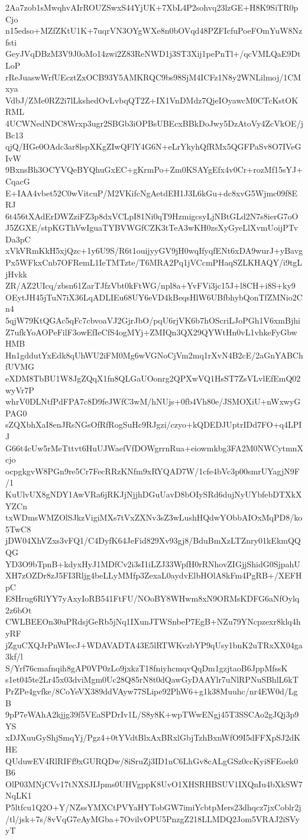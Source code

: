 2Aa7zob1sMwqhvAIrROUZSwxS44YjUK+7XbL4P2sohvq23lzGE+H8K9SiTR0pCjo
n15edso+MZfZKtU1K+7uqrVN3OYgWXe8n0bOVqd48PZFIcfuPoeFOmYuW8Nzfsti
GeyJVqDBzM3V9J0oMo14zwi2Z83ReNWD1j3ST3Xij1pePnTl+/qcVMLQaE9DtLoP
rReJuaswWrfUEcztZxOCB93Y5AMKRQC9bs98SjM4ICFz1N8y2WNLilmoj/1CMxya
VdbJ/ZMe0RZ2i7lLkshedOvLvbqQT2Z+IX1VnDMdz7QjeIOyawcM0CTcKstOKRML
4UCWNedNDC8Wrxp3ugr2SBGb3iOPBsUBEcxBBkDoJwy5DzAtoVy4ZcVkOE/jBc13
qjQ/HGe0OAdc3ar8lspXKgZIwQFlY4G6N+eLrYkyhQfRMx5QGFPaSv8O7IVeGIvW
9BxnsBh3OCYVQeBYQhuGxEC+gKrmPo+Zm0KSAYgEfx4v0Cr+rozMf15sYJ+CqacG
E+IAA4vbet52C0wVitcuP/M2VKifcNgAetdEH1J3L6kGu+dc8xvG5Wjmc09f8ERJ
6t456tXAdErDWZziFZ3p8dxVCLpI81Ni0qT9HzmigcsyLjNBtGLd2N7s8ierG7oO
J5ZGXE/stpKGThVwIguaTYBVWGfCZK3tTeA3wKH0zsXyGyeLlXvmUoijPTvDa3pC
xVkVRmKkH5xjQzc+1y6U9S/R6t1ouijyyGV9jH0wqIfyqfENt6xDA9wurJ+yBavg
Px5WFkxCnb7OFRemL1IeTMTzte/T6MRA2Pq1jVCcmPHaqSZLKHAQY/i9tgLjHvkk
ZR/AZ2UIcq/zbsn61ZarTJfzVbt0kFtWG/npl8a+YvFVi3jc15J+l8CH+i8S+ky9
OEytJH45jTuN7iX36LqADLIEu68UY6eVD4kBeqsHlW6UBfbhybQonTfZMNio2Cn4
5qjW79KtQGAc5qFc7cbvoaVJ2GjrJbO/pqU6rjVK6b7hOScriLJoPGh1V6xmBjhi
Z7ufkYoAOPeFilF3owEfIeCfS4ogMYj+ZMIQn3QX29QYWtHn0vL1vhkeFyGbwHMB
Hn1gddutYxEdk8qUhWU2iFM0Mg6wVGNoCjVm2mq1rXvN4B2cE/2aGnYABChfUVMG
eXDM8TbBU1W8JgZQqX1fn8QLGaUOonrg2QPXwVQ1HsST7ZsVLvlEfEmQ02wyVr7P
whrV0DLNtfPdFPA7c8D9feJWfC3wM/hNUjs+0fb4Vh80e/JSMOXiU+nWxwyGPAG0
sZQXbhXaI8enJRsNGsOfRfRogSuHc9RJgzi/czyo+kQDEDJUptrIDd7FO+q4LPIJ
G66t4cUw5rMeTttvt6HuUJWaefVfDOWgrrnRua+eiowmkbg3FA2M0NWCytmnXcjo
ocpgkgvW8PGn9re5Cr7FecRRzKNfm9xRYQAD7W/1cfe4bVc3p00smrUYagjN9F/1
KuUlvUX8gNDY1AwVRa6jRKJjNjjhDGuUavD8bOIySRd6dujNyUYbfebDTXkXYZCn
txWDmsWMZOlSJkzVigiMXs7tVxZXNv3sZ3wLushHQdwYObbAIOxMqPD8/ko5TwC8
jDW04XhVZxs3vFQ1/C4DyfK64JeFid829Xv93gj8/BduBmXzLTZnry01kEkmQQQG
YD3O9bTpnB+kdyxHyJ1MDfCv2i3sI1iLZJ33WpfH0rRNhovZIGjjShidG0SjpahU
XH7zOZDr8zJ5FI3Rljg4beLLyMMfp3ZexaL0aydvElbHOlA8kFm4PgRB+/XEFHpC
E8Hrug6RlYY7yAxyIoRB541FtFU/NOoBY8WHwm8xN9ORMsKDFG6aNfOylq2z6bOt
CWLBEEOn30uPRdsjGeRb5jNq1IXunJTWSnbeP7EgB+NZu79YNcpzexr8klq4hyRF
jZguCXQJrPnWIecJ+WDAVADTA43E5lRTWKvzbYP9qUsy1bnK2uTRxXX04ga3kf/l
S/Yrf76cmafnqih8gAP0VP0zLo9jxkzT18fniyhcmqvQqDm1gzjtaoB6JppMfssK
s1et045te2Lr45x03dviMgm0Uc28Q85rN8t0dQawGyDAAYlr7uNlRPNuSBhlL6kT
PrZPe4gvfke/8CoYeVX389ddVAyw77SLipe92PhW6+g1k38Muuhc/nr4EW0d/LgB
9pP7eWAhA2kjjg39f5VEaSPDrIv1L/S8y8K+wpTWwENgj45T3SSCAo2gJQj3p9YS
xDJXuuGyShjSmqYj/Pgz4+0tYVdtBlxAxBRxlGbjTzhBxnWfO9I5dFFXpSJ2dKHE
QUduwEV4RlRIFf9xGURQDw/8iSruZj3ID1nC6LhGv8cALgGSz0ccKyi8FEoek0B6
OlP03MNjCVv17tNXSJIJpms0UHVgppK8UvO1XHSRHBSUV1IXQnIu4bXkSW7NqLK1
P5ltfcu1Q2O+Y/NZssYMXCtPVYaHYTobGW7imiYcbtpMers23dhqcz7jxCoblr2j
/tl/jsk+7s/8vVqG7eAyMGba+7OvilvOPU5PnzgZ218LLMDQ2Jom5VRAJ2iSVyyT
